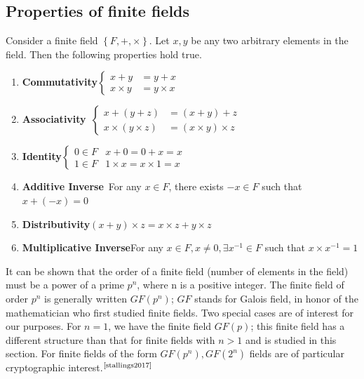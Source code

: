 \documentclass[cryptography,article,submit,moreauthors,pdftex]{Definitions/mdpi}
\begin{document}
\subsection{Properties of finite fields}
\begin{flushleft}
Consider a finite field $\left\{F,+,\times\right\}$. Let $x,y$ be any two arbitrary elements in the field. Then the following properties hold true.
\begin{enumerate}
	\item \textbf{Commutativity}\qquad\quad $\begin{cases}x+y&=y+x\\x\times y&=y\times x\end{cases}$
	\item \textbf{Associativity}\qquad\qquad\, $\begin{cases}x+(y+z)&=(x+y)+z\\x\times(y\times z)&=(x\times y)\times z\end{cases}$
	\item \textbf{Identity}\qquad\qquad\qquad\quad $\begin{cases}0\in F& x+0=0+x=x\\1\in F&1\times x=x\times 1=x\end{cases}$
	\item \textbf{Additive Inverse}\qquad\quad\, For any $x\in F$, there exists $-x\in F$ such that $x+(-x)=0$
	\item \textbf{Distributivity}\qquad\qquad\quad $(x+y)\times z=x\times z+y\times z$
	\item \textbf{Multiplicative Inverse}\quad For any $x\in F,x\neq 0, \exists x^{-1}\in F$ such that $x\times x^{-1}=1$
\end{enumerate}
\end{flushleft}

\begin{flushleft}
It can be shown that the order of a finite field (number of elements in the field) must be a power of a prime $p^n$, where n is a positive integer. The finite field of order $p^n$ is generally written $GF(p^n)$; $GF$ stands for Galois field, in honor of the mathematician who first studied finite fields. Two special cases are of interest for our purposes. For $n = 1$, we have the finite field $GF(p)$; this finite field has a different structure than that for finite fields with $n>1$ and is studied in this section. For finite fields of the form $GF(p^n), GF(2^n)$ fields are of particular cryptographic interest.${^{\text{\cite{stallings2017}}}}$
\end{flushleft}
\end{document}
